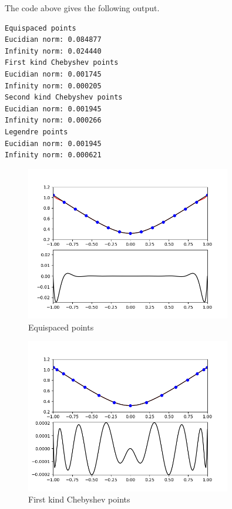 \documentclass[12pt]{article}
\begin{document}
	The code above gives the following output.
	\begin{lstlisting}
Equispaced points
Eucidian norm: 0.084877
Infinity norm: 0.024440
First kind Chebyshev points
Eucidian norm: 0.001745
Infinity norm: 0.000205
Second kind Chebyshev points
Eucidian norm: 0.001945
Infinity norm: 0.000266
Legendre points
Eucidian norm: 0.001945
Infinity norm: 0.000621
	\end{lstlisting}
	
	\begin{figure}[H]
		\caption{Equispaced points}
		\includegraphics[width=0.80\textwidth]{hw4_figure_1}
		\centering
	\end{figure}
	\begin{figure}[H]
		\caption{First kind Chebyshev points}
		\includegraphics[width=0.80\textwidth]{hw4_figure_2}
		\centering
	\end{figure}
\end{document}
